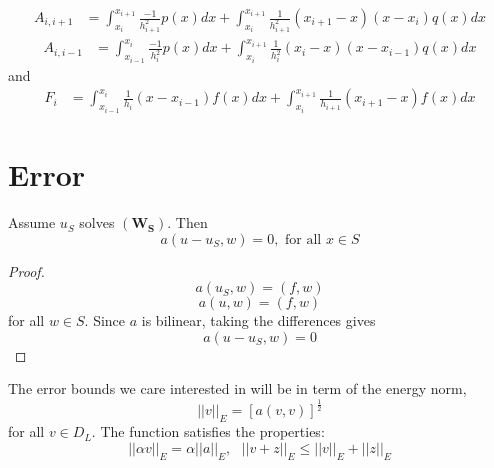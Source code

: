 \[\begin{array}{ll}
A_{i,i+1}&=\int_{x_{i}}^{x_{i+1}}\frac{-1}{h_{i+1}^2}p(x)dx 
+\int_{x_{i}}^{x_{i+1}}\frac{1}{h_{i+1}^2}(x_{i+1}-x)(x-x_i)q(x)dx 
\end{array}
 \]
\[\begin{array}{ll}
A_{i,i-1}&=\int_{x_{i-1}}^{x_{i}}\frac{-1}{h_{i}^2}p(x)dx 
+\int_{x_{i}}^{x_{i+1}}\frac{1}{h_{i}^2}(x_{i}-x)(x-x_{i-1})q(x)dx 
\end{array}
 \]
and
\[\begin{array}{ll}
F_{i}&=\int_{x_{i-1}}^{x_{i}}\frac{1}{h_{i}}(x-x_{i-1})f(x)dx 
+\int_{x_{i}}^{x_{i+1}}\frac{1}{h_{i+1}}(x_{i+1}-x)f(x)dx 
\end{array}
 \]
\section{Error}
\begin{lemma}
Assume $u_S$ solves $\mathbf{(W_S)}$. Then
\[a(u-u_S,w)=0, \mbox{  for all } x \in S \]
\end{lemma}

\begin{proof}
\[a(u_S,w)=(f,w) \]
\[a(u,w)=(f,w) \]
for all $w \in S$. Since $a$ is bilinear, taking the differences gives
\[a(u-u_S,w)=0 \]
\end{proof}

The error bounds we care interested in will be in term of the energy norm,
\[||v||_E=[a(v,v)]^{\frac{1}{2}} \]
for all $v\in D_L$.  The function satisfies the properties:
\[||\alpha v||_E=\alpha ||a||_E, \ \ \ ||v+z||_{E}\leq ||v||_E+||z||_E \]

